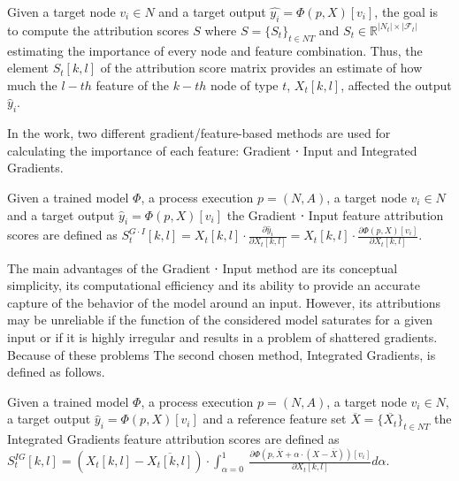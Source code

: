             \begin{definition}
            \label{def:feat_attr} 
                Given a target node $v_i\in N$ and a target output $\hat{y_i} =\Phi(p,X)[v_i]$, the goal is to compute the attribution scores $S$ where $S = \{S_t\}_{t\in NT}$ and $S_t \in \mathbb{R}^{|N_t| \times |\mathcal{F}_t|}$ estimating the importance of every node and feature combination. Thus, the element $S_t[k,l]$ of the attribution score matrix provides an estimate of how much the $l-th$ feature of the $k-th$ node of type $t$, $X_t[k,l]$, affected the output $\hat{y}_i$.
            \end{definition}
            
            In the work, two different gradient/feature-based methods are used for calculating the importance of each feature: Gradient ⋅ Input and Integrated Gradients. 

            \begin{definition}
            \label{def:grad_input}
                Given a trained model $\Phi$, a process execution $p=(N,A)$, a target node $v_i\in N$ and a target output $\hat{y}_i=\Phi(p,X)[v_i]$ the Gradient ⋅ Input feature attribution scores are defined as
                $S_t^{G\cdot I}[k,l]=X_t[k,l]⋅\frac{\partial \hat{y}_i}{\partial X_t[k,l]}=X_t[k,l]⋅\frac{\partial \Phi(p,X)[v_i]}{\partial X_t[k,l]}$.
            \end{definition}
            
            The main advantages of the Gradient ⋅ Input method are its conceptual simplicity, its computational efficiency and its ability to provide an accurate capture of the behavior of the model around an input. However, its attributions may be unreliable if the function of the considered model saturates for a given input or if it is highly irregular and results in a problem of shattered gradients. Because of these problems The second chosen method, Integrated Gradients, is defined as follows.

            \begin{definition}
            \label{def:int_grad}
                Given a trained model $\Phi$, a process execution $p=(N,A)$, a target node $v_i\in N$, a target output $\hat{y}_i=\Phi(p,X)[v_i]$ and a reference feature set $\overline X = \{\overline{X_t}\}_{t\in NT}$ the Integrated Gradients feature attribution scores are defined as
                $S_t^{IG}[k,l]=(X_t[k,l]-\overline{X_t[k,l]}) \cdot \int_{\alpha=0}^{1} \:{\frac{\partial \Phi(p,\overline{X} + \alpha \cdot (X-\overline{X}))[v_i]}{\partial X_t[k,l]}}d \alpha$.
            \end{definition}
            
